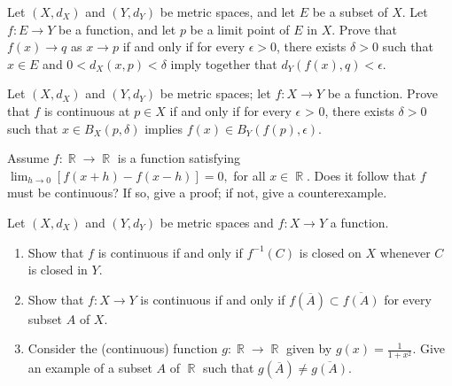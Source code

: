 \documentclass[12pt,letterpaper,boxed]{hmcpset}
\DeclareMathOperator{\R}{\mathbb{R}}
\begin{document}

\begin{problem}[Exercise 1.2]
Let $(X, d_X)$ and $(Y, d_Y)$ be metric spaces, and let $E$ be a subset of $X$. Let $f : E \rightarrow Y$ be a function, and let $p$ be a limit point of $E$ in $X$. Prove that $f(x) \rightarrow q$ as $x\rightarrow p$ if and only if for every $\epsilon > 0$, there exists $\delta > 0$ such that $x \in E$ and $0 < d_X(x,p) < \delta$ imply together that $d_Y(f(x), q) < \epsilon.$
\end{problem}

\begin{solution}

\end{solution}

\begin{problem}[Exercise 2.2]
Let $(X, d_X)$ and $(Y, d_Y)$ be metric spaces; let $f : X \rightarrow Y$ be a function. Prove that $f$ is continuous at $p\in X$ if and only if for every $\epsilon$ > 0, there exists $\delta > 0$ such that $x \in B_X(p,\delta)$ implies $f(x)\in B_Y(f(p), \epsilon)$.
\end{problem}

\begin{solution}

\end{solution}

\begin{problem}[Exercise 2.9]
Assume $f: \R \rightarrow \R$ is a function satisfying $\lim_{h\rightarrow 0} [f(x + h) - f(x - h)] = 0,$ for all $x \in \R$. Does it follow that $f$ must be continuous? If so, give a proof; if not, give a counterexample.
\end{problem}

\begin{solution}

\end{solution}

\begin{problem}[Exercise 2.10]
Let $(X, d_X)$ and $(Y, d_Y)$ be metric spaces and $f: X \rightarrow Y$ a function. 
\vspace{-2mm}
    \begin{enumerate}
        \itemsep0em
        \item Show that $f$ is continuous if and only if $f^{-1}(C)$ is closed on $X$ whenever $C$ is closed in $Y$.
        \item Show that $f: X \rightarrow Y$ is continuous if and only if $f(\overline{A})\subset\overline{f(A)}$ for every subset $A$ of $X$.
        \item Consider the (continuous) function $g: \R \rightarrow \R$ given by $g(x) = \frac{1}{1 + x^{2}}.$ Give an example of a subset $A$ of $\R$ such that $g(\overline{A})\neq\overline{g(A)}.$
    \end{enumerate}
\end{problem}
\end{document}
